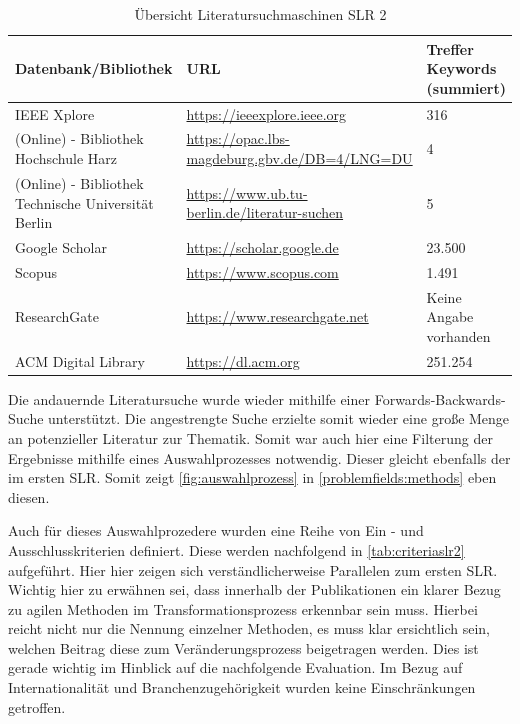 \begin{table}[ht]
	\centering
	\caption{Übersicht Literatursuchmaschinen SLR 2}
	\begin{tabular}{|p{5cm}|p{7cm}||p{3cm}|}
		\hline
		\textbf{Datenbank/Bibliothek}& \textbf{URL} &  \textbf{Treffer Keywords  (summiert)} \\
		\hline
		IEEE Xplore & \url{https://ieeexplore.ieee.org} & 316 \\
		(Online) - Bibliothek Hochschule Harz & \url{https://opac.lbs-magdeburg.gbv.de/DB=4/LNG=DU} & 4 \\
		(Online) - Bibliothek Technische Universität Berlin  & \url{https://www.ub.tu-berlin.de/literatur-suchen}& 5 \\
		Google Scholar &  \url{https://scholar.google.de}  & 23.500 \\
		Scopus & \url{https://www.scopus.com} & 1.491 \\
		ResearchGate & \url{https://www.researchgate.net} &Keine Angabe vorhanden \\ 
		ACM Digital Library & \url{https://dl.acm.org} & 251.254 \\
		\hline
	\end{tabular}
	\label{tab:suchmaschinenslr2}
\end{table}

Die andauernde Literatursuche wurde wieder mithilfe einer Forwards-Backwards-Suche unterstützt. Die angestrengte Suche erzielte somit wieder eine große Menge an potenzieller Literatur zur Thematik. Somit war auch hier eine Filterung der Ergebnisse mithilfe eines Auswahlprozesses notwendig. Dieser gleicht ebenfalls der im ersten SLR. Somit zeigt \ref{fig:auswahlprozess} in \ref{problemfields:methods} eben diesen. 

Auch für dieses Auswahlprozedere wurden eine Reihe von Ein - und Ausschlusskriterien definiert. Diese werden nachfolgend in \ref{tab:criteriaslr2} aufgeführt. Hier hier zeigen sich verständlicherweise Parallelen zum ersten SLR. Wichtig hier zu erwähnen sei, dass innerhalb der Publikationen ein klarer Bezug zu agilen Methoden im Transformationsprozess erkennbar sein muss. Hierbei reicht nicht nur die Nennung einzelner Methoden, es muss klar ersichtlich sein, welchen Beitrag diese zum Veränderungsprozess beigetragen werden. Dies ist gerade wichtig im Hinblick auf die nachfolgende Evaluation. Im Bezug auf Internationalität und Branchenzugehörigkeit wurden keine Einschränkungen getroffen.

